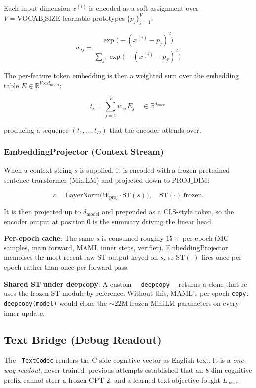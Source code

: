 \documentclass[12pt]{article}
\begin{document}
Each input dimension $x^{(i)}$ is encoded as a soft assignment over $V
= \text{VOCAB\_SIZE}$ learnable prototypes $\{p_j\}_{j=1}^{V}$:

\[
  w_{ij} = \frac{\exp\big(-(x^{(i)} - p_j)^2\big)}
                 {\sum_{j'} \exp\big(-(x^{(i)} - p_{j'})^2\big)}
\]

The per-feature token embedding is then a weighted sum over the
embedding table $E \in \mathbb{R}^{V \times d_{\text{model}}}$:

\[
  t_i = \sum_{j=1}^{V} w_{ij}\, E_j \quad \in \mathbb{R}^{d_{\text{model}}}
\]

producing a sequence $(t_1, \ldots, t_D)$ that the encoder attends
over.

\subsubsection{EmbeddingProjector (Context Stream)}

When a context string $s$ is supplied, it is encoded with a frozen
pretrained sentence-transformer (MiniLM) and projected down to
$\text{PROJ\_DIM}$:

\[
  c = \text{LayerNorm}\big(W_{\text{proj}}\cdot \text{ST}(s)\big),
  \quad \text{ST}(\cdot)\ \text{frozen}.
\]

It is then projected up to $d_{\text{model}}$ and prepended as a
CLS-style token, so the encoder output at position $0$ is the summary
driving the linear head.

\textbf{Per-epoch cache}: The same $s$ is consumed roughly $15\times$
per epoch (MC samples, main forward, MAML inner steps, verifier).
EmbeddingProjector memoises the most-recent raw ST output keyed on
$s$, so $\text{ST}(\cdot)$ fires once per epoch rather than once per
forward pass.

\textbf{Shared ST under deepcopy}: A custom
\texttt{\_\_deepcopy\_\_} returns a clone that re-uses the frozen ST
module by reference. Without this, MAML's per-epoch \texttt{copy.\\
deepcopy(model)} would clone the $\sim 22$M frozen MiniLM parameters
on every inner update.

\subsection{Text Bridge (Debug Readout)}

The \texttt{\_TextCodec} renders the C-side cognitive vector as English
text. It is a \emph{one-way readout}, never trained: previous attempts
established that an 8-dim cognitive prefix cannot steer a frozen GPT-2,
and a learned text objective fought $L_{\text{base}}$.
\end{document}
